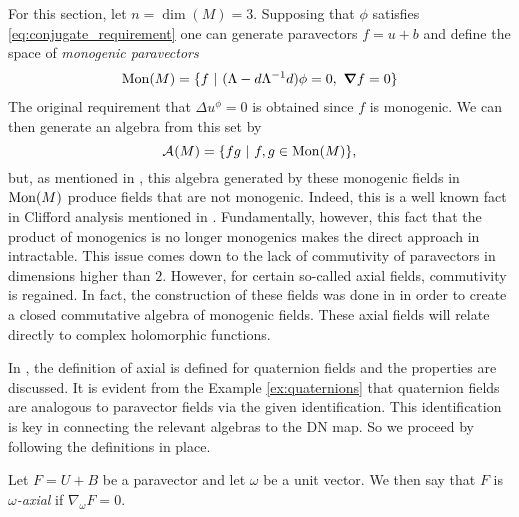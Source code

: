 \documentclass[12pt]{article}
\begin{document}
For this section, let $n=\dim(M)=3$. Supposing that $\phi$ satisfies \ref{eq:conjugate_requirement} one can generate paravectors $f=u+b$ and define the space of \emph{monogenic paravectors}
\begin{align*}
\operatorname{Mon}(M) &= \{ f ~ \vert ~ (\Lambda - d\Lambda^{-1}d)\phi =0, ~\boldsymbol{\nabla} f=0\}\\
\end{align*}
The original requirement that $\Delta u^\phi =0$ is obtained since $f$ is monogenic. We can then generate an algebra from this set by
\[
\mathcal{A}_{}(M) = \{ fg ~\vert~ f,g \in \operatorname{Mon}(M)\},
\]
but, as mentioned in \cite{belishev_algebras_2019}, this algebra generated by these monogenic fields in $\operatorname{Mon}(M)$ produce fields that are not monogenic.  Indeed, this is a well known fact in Clifford analysis mentioned in \cite{schepper_introductory_nodate}.  Fundamentally, however, this fact that the product of monogenics is no longer monogenics makes the direct approach in \cite{belishev_calderon_2003} intractable. This issue comes down to the lack of commutivity of paravectors in dimensions higher than $2$.  However, for certain so-called axial fields, commutivity is regained. In fact, the construction of these fields was done in \cite{belishev_algebras_2017} in order to create a closed commutative algebra of monogenic fields. These axial fields will relate directly to complex holomorphic functions.

In \cite{belishev_algebras_2017, belishev_algebras_2019}, the definition of axial is defined for quaternion fields and the properties are discussed.  It is evident from the Example \ref{ex:quaternions} that quaternion fields are analogous to paravector fields via the given identification.  This identification is key in connecting the relevant algebras to the DN map. So we proceed by following the definitions in place.  

\begin{definition}
    Let $F=U+B$ be a paravector and let $\omega$ be a unit vector.  We then say that $F$ is \emph{$\omega$-axial} if $\nabla_\omega F = 0$.  
\end{definition}

\end{document}
